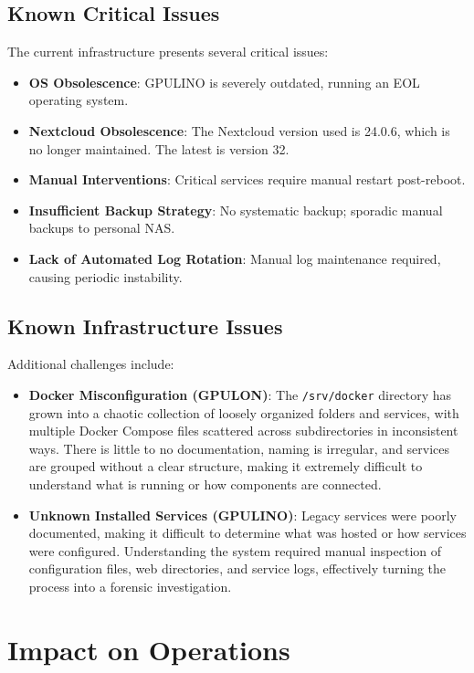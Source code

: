\subsection{Known Critical Issues}

The current infrastructure presents several critical issues:
\begin{itemize}
  \item \textbf{OS Obsolescence}: GPULINO is severely outdated, running an EOL operating system.
  \item \textbf{Nextcloud Obsolescence}: The Nextcloud version used is 24.0.6, which is no longer maintained. The latest is version 32.
  \item \textbf{Manual Interventions}: Critical services require manual restart post-reboot.
  \item \textbf{Insufficient Backup Strategy}: No systematic backup; sporadic manual backups to personal NAS.
  \item \textbf{Lack of Automated Log Rotation}: Manual log maintenance required, causing periodic instability.
\end{itemize}

\subsection{Known Infrastructure Issues}

Additional challenges include:
\begin{itemize}
  \item \textbf{Docker Misconfiguration (GPULON)}: The \texttt{/srv/docker} directory has grown into a chaotic collection of loosely organized folders and services, with multiple Docker Compose files scattered across subdirectories in inconsistent ways. There is little to no documentation, naming is irregular, and services are grouped without a clear structure, making it extremely difficult to understand what is running or how components are connected.
  \item \textbf{Unknown Installed Services (GPULINO)}: Legacy services were poorly documented, making it difficult to determine what was hosted or how services were configured. Understanding the system required manual inspection of configuration files, web directories, and service logs, effectively turning the process into a forensic investigation.
\end{itemize}

\section{Impact on Operations}


